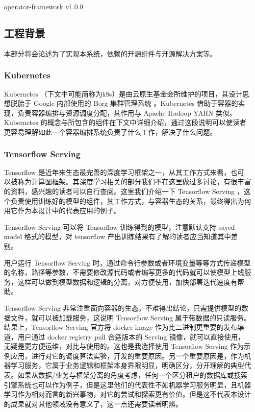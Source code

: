 operator-framework v1.0.0

\subsection{工程背景}

本部分将会论述为了实现本系统，依赖的开源组件与开源解决方案等。

\subsubsection{Kubernetes}

Kubernetes \cite{kubernetes} （下文中可能简称为k8s）是由云原生基金会所维护的项目，其设计思想脱胎于 Google 内部使用的 Borg 集群管理系统 \cite{borg} 。Kubernetes 借助于容器的实现，负责容器编排与资源调度分配，其作用与 Apache Hadoop YARN \cite{hadoop} 类似。Kubernetes 的概念与所包含的组件在下文中详细介绍，通过这段说明可以使读者更容易理解如此一个容器编排系统负责了什么工作，解决了什么问题。

\subsubsection{Tensorflow Serving}

Tensorflow 是近年来生态最完善的深度学习框架之一，从其工作方式来看，也可以被称为计算图框架。其深度学习相关的部分我们不在这里做过多讨论，有很丰富的资料，感兴趣的读者可以自行查阅。这里我们介绍一下 Tensorflow Serving \cite{serving} ，这个负责使用训练好的模型的组件，其工作方式，与容器生态的关系，最终得出为何用它作为本设计中的代表应用的例子。

Tensorflow Serving 可以将 Tensorflow 训练得到的模型，注意默认支持 saved model 格式的模型，对 tensorflow 产出训练结果有了解的读者应当知道其中差别。

用户运行 Tensorflow Serving 时，通过命令行参数或者环境变量等等方式传递模型的名称，路径等参数，不需要修改源代码或者编写更多的代码就可以使模型上线服务，这样可以做到模型数据和逻辑的分离，对方便使用，加快部署迭代速度有帮助。

Tensorflow Serving 非常注重面向容器的生态，不难得出结论，只需提供模型的数据文件，就可以被加载服务，这说明 Tensorflow Serving 属于带数据的只读服务。结果上，Tensorflow Serving 官方将 docker image 作为比二进制更重要的发布渠道，用户通过 docker registry pull 合适版本的 Serving 镜像，就可以直接使用，无疑是更方便运维，对比与使用的。这也是我选择使用 Tensorflow Serving 作为示例应用，进行对它的调度算法实验，开发的重要原因。另一个重要原因是，作为机器学习服务，它属于业务逻辑和框架本身界限明显，明确区分，分开理解的典型代表。如果从数据/业务与框架分离的角度考虑，任何一个区分租户的数据库或搜索引擎系统也可以作为例子，但是这里他们的代表性不如机器学习服务明显，且机器学习作为相对而言的新兴事物，对它的尝试和探索更有价值。但是这不代表本设计的成果就对其他领域没有意义了，这一点还需要读者明辨。

